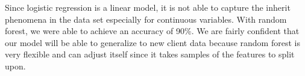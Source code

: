 \documentclass{mytemplate}%
\begin{document}
\begin{multicols}{2}
Since logistic regression is a linear model, it is not able to capture the inherit phenomena in the data set especially for continuous variables. With random forest, we were able to achieve an accuracy of 90\%. We are fairly confident that our model will be able to generalize to new client data because random forest is very flexible and can adjust itself since it takes samples of the features to split upon.





 \end{multicols}
\end{document}
